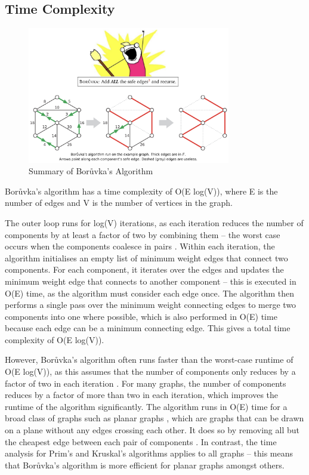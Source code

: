 \documentclass[a4paper, 11pt]{article}
\begin{document}
\subsection{Time Complexity}
\begin{figure}[h]
    \caption{Summary of Borůvka's Algorithm \cite{erickson2014MSTs}}
    \begin{center}
        \includegraphics[width=0.79\textwidth]{Summary of Boruvka's Algorithm.png}
    \end{center}
\end{figure}

Borůvka's algorithm has a time complexity of O(E log(V)), where E is the number of edges and V is the number of vertices in the graph.

The outer loop runs for log(V) iterations, as each iteration reduces the number of components by at least a factor of two by combining them -- the worst case occurs when the components coalesce in pairs \cite{erickson2014MSTs}. Within each iteration, the algorithm initialises an empty list of minimum weight edges that connect two components. For each component, it iterates over the edges and updates the minimum weight edge that connects to another component -- this is executed in O(E) time, as the algorithm must consider each edge once. The algorithm then performs a single pass over the minimum weight connecting edges to merge two components into one where possible, which is also performed in O(E) time because each edge can be a minimum connecting edge. This gives a total time complexity of O(E log(V)).

However, Borůvka's algorithm often runs faster than the worst-case runtime of O(E log(V)), as this assumes that the number of components only reduces by a factor of two in each iteration \cite{erickson2014MSTs}. For many graphs, the number of components reduces by a factor of more than two in each iteration, which improves the runtime of the algorithm significantly. The algorithm runs in O(E) time for a broad class of graphs such as planar graphs \cite{cheriton1976finding}, which are graphs that can be drawn on a plane without any edges crossing each other. It does so by removing all but the cheapest edge between each pair of components \cite{marevs2002two}. In contrast, the time analysis for Prim's and Kruskal's algorithms applies to all graphs -- this means that Borůvka's algorithm is more efficient for planar graphs amongst others.
\end{document}
